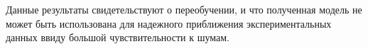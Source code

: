 \documentclass[11pt,a4paper]{article}
\theoremstyle{definition}
\begin{document}
Данные результаты свидетельствуют о переобучении, и что полученная модель не может быть
использована для надежного приближения экспериментальных данных ввиду большой чувствительности
к шумам.

\end{document}
